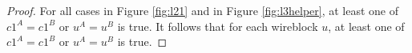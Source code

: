 \documentclass[12pt]{report}
\begin{document}
\begin{proof}
For all cases in Figure \ref{fig:l21} and in Figure \ref{fig:l3helper}, at least one of $c1^A=c1^B$ or $u^A=u^B$ is true. It follows that for each wireblock $u$, at least one of $c1^A=c1^B$ or $u^A=u^B$ is true.
%
%
%
%
%


\end{proof}
\end{document}
